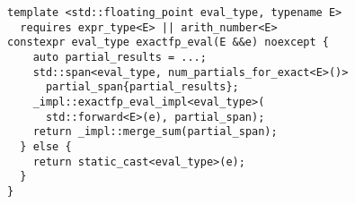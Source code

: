 \begin{lstlisting}[basicstyle=\small\ttfamily]
template <std::floating_point eval_type, typename E>
  requires expr_type<E> || arith_number<E>
constexpr eval_type exactfp_eval(E &&e) noexcept {
    auto partial_results = ...;
    std::span<eval_type, num_partials_for_exact<E>()>
      partial_span{partial_results};
    _impl::exactfp_eval_impl<eval_type>(
      std::forward<E>(e), partial_span);
    return _impl::merge_sum(partial_span);
  } else {
    return static_cast<eval_type>(e);
  }
}
\end{lstlisting}
